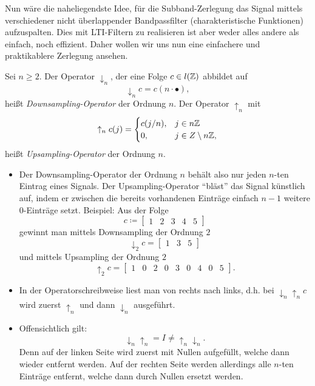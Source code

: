 Nun wäre die naheliegendste Idee, für die Subband-Zerlegung das Signal mittels verschiedener 
nicht überlappender Bandpassfilter (charakteristische Funktionen) aufzuspalten. Dies mit 
LTI-Filtern zu realisieren ist aber weder alles andere als einfach, noch effizient. Daher wollen 
wir uns nun eine einfachere und praktikablere Zerlegung ansehen.

\begin{definition}
Sei $ n \geq 2 $. Der Operator $ \downarrow_{n} $, der eine Folge $ c \in l(\mathbb{Z}) $ abbildet auf
\[
  \downarrow_{n} c = c(n \cdot \bullet),
\]
heißt \emph{Downsampling-Operator} der Ordnung $ n $. Der Operator $ \uparrow_{n} $ mit
\[
  \uparrow_{n} c(j) = \begin{cases}
    c(j / n), & j \in n\mathbb{Z} \\
    0, & j \in Z \setminus n\mathbb{Z},
  \end{cases}
\]
heißt \emph{Upsampling-Operator} der Ordnung $ n $.
\end{definition}

\begin{remark}\leavevmode
\begin{itemize}
\item Der Downsampling-Operator der Ordnung $ n $ behält also nur jeden $ n $-ten Eintrag eines 
  Signals. Der Upsampling-Operator \enquote{bläst} das Signal künstlich auf, indem er zwischen die 
  bereits vorhandenen Einträge einfach $ n - 1 $ weitere $ 0 $-Einträge setzt. Beispiel: Aus der
  Folge
  \[
    c \coloneqq \begin{bmatrix} 1 & 2 & 3 & 4 & 5 \end{bmatrix}
  \]
  gewinnt man mittels Downsampling der Ordnung $ 2 $
  \[
    \downarrow_{2} c = \begin{bmatrix} 1 & 3 & 5 \end{bmatrix}
  \]
  und mittels Upsampling der Ordnung $ 2 $
  \[
    \uparrow_{2} c = \begin{bmatrix} 1 & 0 & 2 & 0 & 3 & 0 & 4 & 0 & 5 \end{bmatrix}.
  \]
\item In der Operatorschreibweise liest man von rechts nach links, d.h. bei
  $ \downarrow_{n} \uparrow_{n} c $ wird zuerst $ \uparrow_{n} $ und dann $ \downarrow_{n} $
  ausgeführt.
\item Offensichtlich gilt:
  \[
    \downarrow_{n} \uparrow_{n} = I \neq{} \uparrow_{n} \downarrow_{n}.
  \]
  Denn auf der linken Seite wird zuerst mit Nullen aufgefüllt, welche dann wieder entfernt werden.
  Auf der rechten Seite werden allerdings alle $ n $-ten Einträge entfernt, welche dann durch Nullen
  ersetzt werden.
\end{itemize}
\end{remark}

